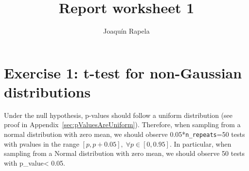\documentclass[12pt]{article}
\title{Report worksheet 1}
\author{Joaqu\'{i}n Rapela}
\begin{document}
\maketitle

\section*{Exercise 1: t-test for non-Gaussian distributions}

Under the null hypothesis, p-values should follow a uniform distribution (see
proof in Appendix~\ref{sec:pValuesAreUniform}). Therefore, when sampling from a
normal distribution with zero mean, we should observe
0.05*\texttt{n\_repeats}=50 tests with pvalues in the range $[p,
p+0.05],\;\forall p\in[0, 0.95]$. In particular, when sampling from a Normal
distribution with zero mean, we should observe 50 tests with p\_value\textless
0.05.
\end{document}
